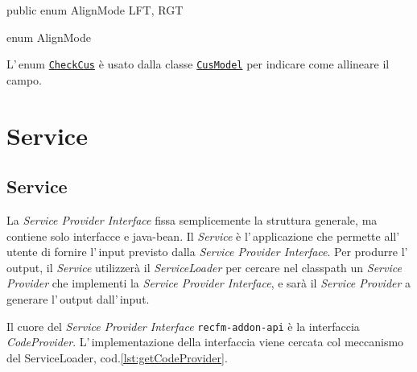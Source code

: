 \documentclass[a4paper,10pt]{report}
\newif\ifesource
\newenvironment{elisting}[1][H]
  {\captionsetup{aboveskip=0pt}\begin{listing}[#1]}
  {\end{listing}%
}
\begin{document}
\ifesource
\begin{lstlisting}[language=java, 
caption=enum AlignMode, 
label=lst:AlignMode]
public enum AlignMode { LFT, RGT }
\end{lstlisting}\index{AlignMode}
\else
\begin{elisting}
\begin{javacode}
public enum AlignMode { LFT, RGT }
\end{javacode}
\caption{enum AlignMode}\label{lst:AlignMode}
\end{elisting}
\fi
L'\,enum \hyperref[lst:CheckCus]{\texttt{CheckCus}} è usato dalla classe
\hyperref[lst:CusModel]{\texttt{CusModel}} per indicare come allineare il campo.


\vfill

\part{Service}\label{vol:srv}

%                                  

\chapter*{Service}
La \textsl{Service Provider Interface} fissa semplicemente la struttura 
generale, ma contiene solo interfacce e java-bean.
Il \textsl{Service} è l'\,applicazione che permette all'\,utente di fornire
l'\,input previsto dalla \textsl{Service Provider Interface}.
Per produrre l'\,output, il \textsl{Service} utilizzerà il 
\textsl{ServiceLoader} per cercare nel classpath un \textsl{Service Provider} 
che implementi la \textsl{Service Provider Interface}, e sarà il 
\textsl{Service Provider} a generare l'\,output dall'\,input.

Il cuore del \textsl{Service Provider Interface} \verb!recfm-addon-api! è la
interfaccia \textsl{CodeProvider}. L'\,implementazione della interfaccia
viene cercata col meccanismo del ServiceLoader, cod.\ref{lst:getCodeProvider}.
\end{document}
